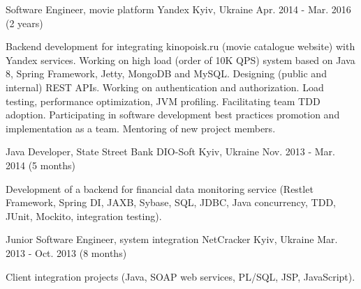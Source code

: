 \begin{cventries}
  \cventry
    {Software Engineer, movie platform} %
    {Yandex} %
    {Kyiv, Ukraine} %
    {Apr. 2014 - Mar. 2016 (2 years)} %
    {
      \begin{cvitems} %
        \item {Backend development for integrating kinopoisk.ru (movie catalogue website) with Yandex services. Working on high load (order of 10K QPS) system based on Java 8, Spring Framework, Jetty, MongoDB and MySQL. Designing (public and internal) REST APIs. Working on authentication and authorization. Load testing, performance optimization, JVM profiling. Facilitating team TDD adoption. Participating in software development best practices promotion and implementation as a team. Mentoring of new project members.}
      \end{cvitems}
    }

  \cventry
    {Java Developer, State Street Bank} %
    {DIO-Soft} %
    {Kyiv, Ukraine} %
    {Nov. 2013 - Mar. 2014 (5 months)} %
    {
      \begin{cvitems} %
        \item {Development of a backend for financial data monitoring service (Restlet Framework, Spring DI, JAXB, Sybase, SQL, JDBC, Java concurrency, TDD, JUnit, Mockito, integration testing).}
      \end{cvitems}
    }

  \cventry
    {Junior Software Engineer, system integration} %
    {NetCracker} %
    {Kyiv, Ukraine} %
    {Mar. 2013 - Oct. 2013 (8 months)} %
    {
      \begin{cvitems} %
        \item {Client integration projects (Java, SOAP web services, PL/SQL, JSP, JavaScript).}
      \end{cvitems}
    }

\end{cventries}
